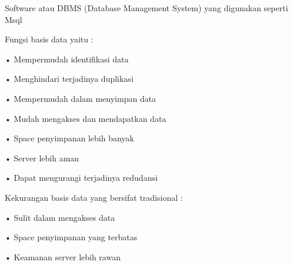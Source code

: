 \documentclass{article}
\begin{document}
\newline
\par Software atau DBMS (Database Management System) yang digunakan seperti Msql 
\newpage
\par Fungsi basis data yaitu :
\par •	Mempermudah identifikasi data 
\par •	Menghindari terjadinya  duplikasi
\par •	Mempermudah dalam menyimpan data
\par •	Mudah mengakses dan mendapatkan data
\par •	Space penyimpanan lebih banyak
\par •	Server lebih aman
\par •	Dapat mengurangi terjadinya redudansi
\newline
\par Kekurangan basis data yang bersifat tradisional :
\par •	Sulit dalam mengakses data
\par •	Space penyimpanan yang terbatas
\par •	Keamanan server lebih rawan

 
\end{document}

